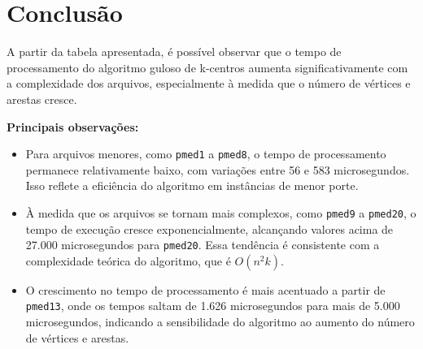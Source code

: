 \documentclass[10pt,conference]{IEEEtran}
\begin{document}
\begin{center}
\end{center}

\section{Conclusão}
A partir da tabela apresentada, é possível observar que o tempo de processamento do algoritmo guloso de k-centros aumenta significativamente com a complexidade dos arquivos, especialmente à medida que o número de vértices e arestas cresce. 

\textbf{Principais observações:}
\begin{itemize}
    \item Para arquivos menores, como \texttt{pmed1} a \texttt{pmed8}, o tempo de processamento permanece relativamente baixo, com variações entre 56 e 583 microsegundos. Isso reflete a eficiência do algoritmo em instâncias de menor porte.
    \item À medida que os arquivos se tornam mais complexos, como \texttt{pmed9} a \texttt{pmed20}, o tempo de execução cresce exponencialmente, alcançando valores acima de 27.000 microsegundos para \texttt{pmed20}. Essa tendência é consistente com a complexidade teórica do algoritmo, que é $O(n^2k)$.
    \item O crescimento no tempo de processamento é mais acentuado a partir de \texttt{pmed13}, onde os tempos saltam de 1.626 microsegundos para mais de 5.000 microsegundos, indicando a sensibilidade do algoritmo ao aumento do número de vértices e arestas.
\end{itemize}
\end{document}
